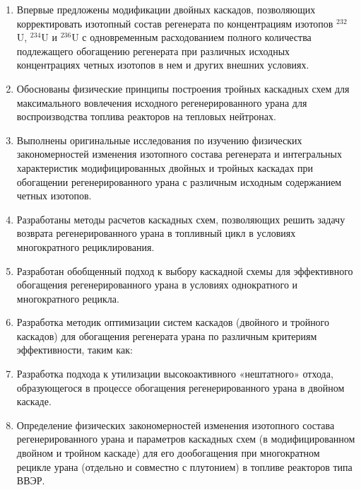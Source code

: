 {\novelty}
\begin{enumerate}
  \item Впервые предложены модификации двойных каскадов, позволяющих корректировать
  изотопный состав регенерата по концентрациям изотопов $^{232}$U, $^{234}$U и $^{236}$U с одновременным расходованием полного количества подлежащего обогащению регенерата при различных исходных концентрациях четных изотопов в нем и других внешних условиях.
  \item Обоснованы физические принципы построения тройных каскадных схем для максимального вовлечения исходного регенерированного урана для воспроизводства топлива реакторов на тепловых нейтронах.
  \item Выполнены оригинальные исследования по изучению физических закономерностей изменения изотопного состава регенерата и интегральных характеристик модифицированных двойных и тройных каскадах при обогащении регенерированного урана с различным исходным содержанием четных изотопов.
  \item Разработаны методы расчетов каскадных схем, позволяющих решить задачу возврата регенерированного урана в топливный цикл в условиях многократного рециклирования.
  \item Разработан обобщенный подход к выбору каскадной схемы для эффективного обогащения регенерированного урана в условиях однократного и многократного рецикла.
  \item Разработка методик оптимизации систем каскадов (двойного и тройного каскадов) для обогащения регенерата урана по различным критериям эффективности, таким как:
  \item Разработка подхода к утилизации высокоактивного «нештатного» отхода, образующегося в процессе обогащения регенерированного урана в двойном каскаде.
  \item Определение физических закономерностей изменения изотопного состава регенерированного урана и параметров каскадных схем (в модифицированном двойном и тройном каскаде) для его дообогащения при многократном рецикле урана (отдельно и совместно с плутонием) в топливе реакторов типа ВВЭР.
\end{enumerate}

